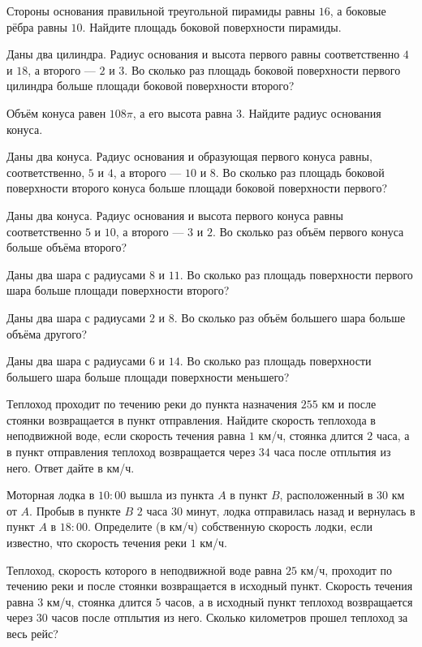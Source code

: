 \begin{class}[number=3]
	\begin{listofex}
		\item Стороны основания правильной треугольной пирамиды равны \(16\), а боковые рёбра равны \(10\). Найдите площадь боковой поверхности пирамиды.
		\item Даны два цилиндра. Радиус основания и высота первого равны соответственно \(4\) и \(18\), а второго --- \(2\) и \(3\). Во сколько раз площадь боковой поверхности первого цилиндра больше площади боковой поверхности второго?
		\item Объём конуса равен \(108\pi \), а его высота равна \(3\). Найдите радиус основания конуса.
		\item Даны два конуса. Радиус основания и образующая первого конуса равны, соответственно, \(5\) и \(4\), а второго --- \(10\) и \(8\). Во сколько раз площадь боковой поверхности второго конуса больше площади боковой поверхности первого?
		\item Даны два конуса. Радиус основания и высота первого конуса равны соответственно \(5\) и \(10\), а второго --- \(3\) и \(2\). Во сколько раз объём первого конуса больше объёма второго?
		\item Даны два шара с радиусами \(8\) и \(11\). Во сколько раз площадь поверхности первого шара больше площади поверхности второго?
		\item Даны два шара с радиусами \(2\) и \(8\). Во сколько раз объём большего шара больше объёма другого?
		\item Даны два шара с радиусами \(6\) и \(14\). Во сколько раз площадь поверхности большего шара больше площади поверхности меньшего?
		\item Теплоход проходит по течению реки до пункта назначения \(255\) км и после стоянки возвращается в пункт отправления. Найдите скорость теплохода в неподвижной воде, если скорость течения равна \(1\) км/ч, стоянка длится \(2\) часа, а в пункт отправления теплоход возвращается через \(34\) часа после отплытия из него. Ответ дайте в км/ч.
		\item Моторная лодка в \(10:00\) вышла из пункта \(A\) в пункт \(B\), расположенный в \(30\) км от \(A\). Пробыв в пункте \(B\) \(2\) часа \(30\) минут, лодка отправилась назад и вернулась в пункт \(A\) в \(18:00\). Определите (в км/ч) собственную скорость лодки, если известно, что скорость течения реки \(1\) км/ч.
		\item Теплоход, скорость которого в неподвижной воде равна \(25\) км/ч, проходит по течению реки и после стоянки возвращается в исходный пункт. Скорость течения равна \(3\) км/ч, стоянка длится \(5\) часов, а в исходный пункт теплоход возвращается через \(30\) часов после отплытия из него. Сколько километров прошел теплоход за весь рейс?

\end{listofex}
\end{class}
